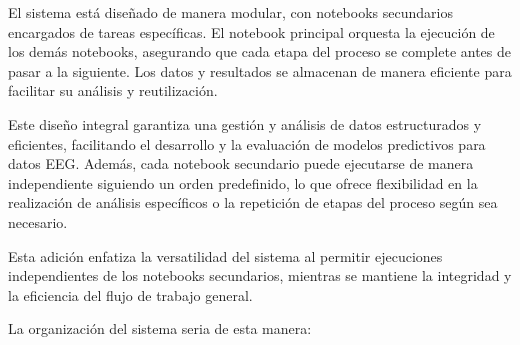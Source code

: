 El sistema está diseñado de manera modular, con notebooks secundarios encargados de tareas específicas. El notebook principal orquesta la ejecución de los demás notebooks, asegurando que cada etapa del proceso se complete antes de pasar a la siguiente. Los datos y resultados se almacenan de manera eficiente para facilitar su análisis y reutilización.

Este diseño integral garantiza una gestión y análisis de datos estructurados y eficientes, facilitando el desarrollo y la evaluación de modelos predictivos para datos EEG. Además, cada notebook secundario puede ejecutarse de manera independiente siguiendo un orden predefinido, lo que ofrece flexibilidad en la realización de análisis específicos o la repetición de etapas del proceso según sea necesario.

Esta adición enfatiza la versatilidad del sistema al permitir ejecuciones independientes de los notebooks secundarios, mientras se mantiene la integridad y la eficiencia del flujo de trabajo general.

La organización del sistema seria de esta manera:



